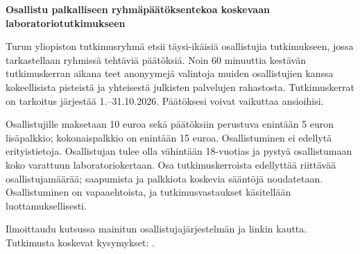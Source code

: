 \begin{infobox}[Suomi]
\textbf{Osallistu palkalliseen ryhmäpäätöksentekoa koskevaan laboratoriotutkimukseen}

Turun yliopiston tutkimusryhmä etsii täysi-ikäisiä osallistujia tutkimukseen, jossa tarkastellaan ryhmissä tehtäviä päätöksiä. Noin 60 minuuttia kestävän tutkimuskerran aikana teet  anonyymejä valintoja muiden osallistujien kanssa kokeellisista pisteistä ja yhteisestä julkisten palvelujen rahastosta. Tutkimuskerrat on tarkoitus järjestää 1.--31.10.2026. Päätöksesi voivat vaikuttaa ansioihisi.

Osallistujille maksetaan 10 euroa sekä päätöksiin perustuva enintään 5 euron lisäpalkkio; kokonaispalkkio on enintään 15 euroa. Osallistuminen ei edellytä erityistietoja. Osallistujan tulee olla vähintään 18-vuotias ja pystyä osallistumaan koko varattuun laboratoriokertaan. Osa tutkimuskerroista edellyttää riittävää osallistujamäärää;  saapumista ja palkkiota koskevia sääntöjä noudatetaan. Osallistuminen on vapaaehtoista, ja tutkimusvastaukset käsitellään luottamuksellisesti.

Ilmoittaudu kutsussa mainitun osallistujajärjestelmän ja linkin kautta. Tutkimusta koskevat kysymykset: \StudyEmail.
\end{infobox}


